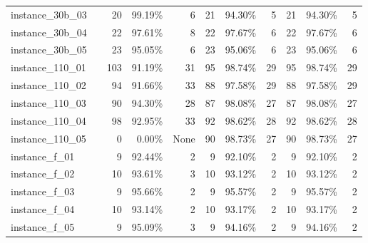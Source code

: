 \documentclass[12pt,a4paper,openright,twoside]{book}
\begin{document}
\begin{table}[H]
{\begin{tabular}{|ll|rrr|rrr|rrr|}
 instance\_30b\_03             &     &   20  &     99.19\%  &   6     &   21  &    94.30\%  &   5   &   21  &     94.30\%  &   5  \\
 instance\_30b\_04             &     &   22  &     97.61\%  &   8     &   22  &    97.67\%  &   6   &   22  &     97.67\%  &   6  \\
 instance\_30b\_05             &     &   23  &     95.05\%  &   6     &   23  &    95.06\%  &   6   &   23  &     95.06\%  &   6  \\
 instance\_110\_01            &     &  103  &    91.19\%  &   31     &   95  &    98.74\%  &   29   &   95  &    98.74\%  &   29  \\
 instance\_110\_02            &     &   94  &    91.66\%  &   33     &   88  &    97.58\%  &   29   &   88  &    97.58\%  &   29  \\
 instance\_110\_03            &     &   90  &   94.30\%   &   28     &   87  &    98.08\%  &   27   &   87  &    98.08\%  &   27  \\
 instance\_110\_04            &     &   98  &    92.95\%  &   33     &   92  &    98.62\%  &   28   &   92  &    98.62\%  &   28  \\
 instance\_110\_05            &     &   0  &   0.00\%  &   None     &   90  &    98.73\%  &   27   &   90  &    98.73\%  &   27  \\
 instance\_f\_01              &     &   9   &     92.44\%  &   2     &   9  &     92.10\%  &   2  &   9  &       92.10\%  &   2  \\
 instance\_f\_02              &     &   10  &     93.61\%  &   3     &   10  &    93.12\%  &   2   &   10  &     93.12\%  &   2  \\
 instance\_f\_03              &     &   9   &     95.66\%  &   2     &   9  &     95.57\%  &   2   &   9  &      95.57\%  &   2  \\
 instance\_f\_04              &     &   10  &     93.14\%  &   2     &   10  &    93.17\%  &   2   &   10  &     93.17\%  &   2  \\
 instance\_f\_05              &     &   9   &     95.09\%  &   3     &   9  &     94.16\%  &   2   &   9  &      94.16\%  &   2  \\
  \hline
\end{tabular}
}
\end{table}
\end{document}
